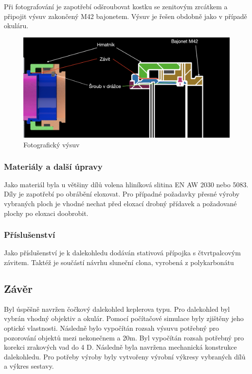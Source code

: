 \documentclass[
]{article}
\begin{document}
Při fotografování je zapotřebí odšroubovat kostku se zenitovým zrcátkem
a připojit výsuv zakončený M42 bajonetem. Výsuv je řešen obdobně jako v
případě okuláru.

\begin{figure}
\centering
\includegraphics{imgs/vysuv_foto.png}
\caption{Fotografický výsuv}
\end{figure}

\hypertarget{materiuxe1ly-a-dalux161uxed-uxfapravy}{%
\subsubsection{Materiály a další
úpravy}\label{materiuxe1ly-a-dalux161uxed-uxfapravy}}

Jako materiál byla u většiny dílů volena hliníková slitina EN AW 2030
nebo 5083. Díly je zapotřebí po obrábění eloxovat. Pro případné
požadavky přesné výroby vybraných ploch je vhodné nechat před eloxací
drobný přídavek a požadované plochy po eloxaci doobrobit.

\hypertarget{materiuxe1ly-a-dalux161uxed-uxfapravy}{%
\subsubsection{Příslušenství}\label{materiuxe1ly-a-dalux161uxed-uxfapravy}}

Jako příslušenství je k dalekohledu dodáván stativová přípojka s čtvrtpalcovým závitem. Taktéž je součástí návrhu sluneční clona, vyrobená z polykarbonátu

\hypertarget{zuxe1vux11br}{%
\subsection{Závěr}\label{zuxe1vux11br}}

Byl úspěšně navržen čočkový dalekohled keplerova typu. Pro dalekohled
byl vybrán vhodný objektiv a okulár. Pomocí počítačové simulace byly
zjištěny jeho optické vlastnosti. Následně bylo vypočítán rozsah výsuvu
potřebný pro pozorování objektů mezi nekonečnem a 20m. Byl vypočítán
rozsah potřebný pro korekci zrakových vad do 4 D. Následně byla navržena
mechanická konstrukce dalekohledu. Pro potřeby výroby byly vytvořeny
výrobní výkresy vybraných dílů a výkres sestavy.
\end{document}
